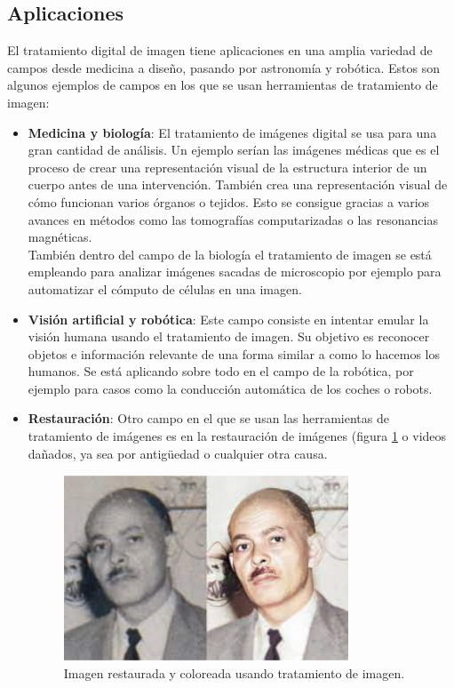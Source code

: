 \documentclass[a4paper,12pt]{report}
\begin{document}
\subsection{Aplicaciones}
El tratamiento digital de imagen tiene aplicaciones en una amplia variedad de campos desde medicina a diseño, pasando por astronomía y robótica.  Estos son algunos ejemplos de campos en los que se usan herramientas de tratamiento de imagen:
\begin{itemize}
\item \textbf{Medicina y biología}: El tratamiento de imágenes digital se usa para una gran cantidad de análisis. Un ejemplo serían las imágenes médicas que es el proceso de crear una representación visual de la estructura interior de un cuerpo antes de una intervención. También crea una representación visual de cómo funcionan varios órganos o tejidos. Esto se consigue gracias a varios avances en métodos como las tomografías computarizadas o las resonancias magnéticas.\\

También dentro del campo de la biología el tratamiento de imagen se está empleando para analizar imágenes sacadas de microscopio por ejemplo para automatizar el cómputo de células en una imagen.\\

\item \textbf{Visión artificial y robótica}: Este campo consiste en intentar emular la visión humana usando el tratamiento de imagen. Su objetivo es reconocer objetos e información relevante de una forma similar a como lo hacemos los humanos. Se está aplicando sobre todo en el campo de la robótica, por ejemplo para casos como la conducción automática de los coches o robots.\\

\item \textbf{Restauración}: Otro campo en el que se usan las herramientas de tratamiento de imágenes es en la restauración de imágenes (figura \ref{restauracion} o videos dañados, ya sea por antigüedad o cualquier otra causa. \\

\begin{figure}[h]
\centering
\includegraphics[width=0.8\textwidth]{imagenes/restauracion}
\caption{Imagen restaurada y coloreada usando tratamiento de imagen.}
\label{restauracion}
\end{figure}


\end{itemize}
\end{document}
